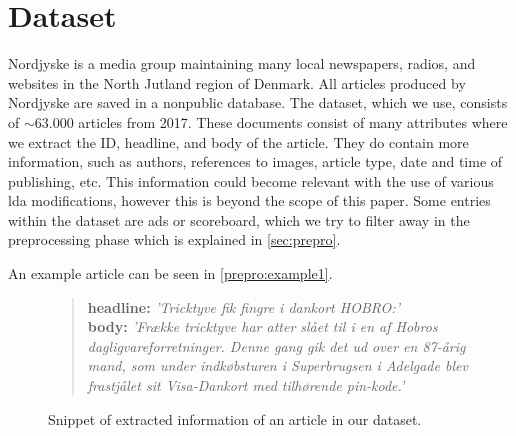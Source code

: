 \section{Dataset}\label{sec:dataset}
Nordjyske is a media group maintaining many local newspapers, radios, and websites in the North Jutland region of Denmark.
All articles produced by Nordjyske are saved in a nonpublic database.
The dataset, which we use, consists of $\sim\! 63.000$ articles from 2017.
These documents consist of many attributes where we extract the ID, headline, and body of the article.
They do contain more information, such as authors, references to images, article type, date and time of publishing, etc.
This information could become relevant with the use of various \gls{lda} modifications, however this is beyond the scope of this paper.
Some entries within the dataset are ads or scoreboard, which we try to filter away in the preprocessing phase which is explained in \autoref{sec:prepro}.

An example article can be seen in \autoref{prepro:example1}.

\begin{figure}[h]
	\begin{framed}
		\begin{quote}
			\textbf{headline:} \textit{'Tricktyve fik fingre i dankort HOBRO:'}\\
			\textbf{body:} \textit{'Frække tricktyve har atter slået til i en af Hobros dagligvareforretninger. Denne gang gik det ud over en 87-årig mand, som under indkøbsturen i Superbrugsen i Adelgade blev frastjålet sit Visa-Dankort med tilhørende pin-kode.'}
		\end{quote}
	\end{framed}
		\caption{Snippet of extracted information of an article in our dataset.}
		\label{prepro:example1}
\end{figure}
